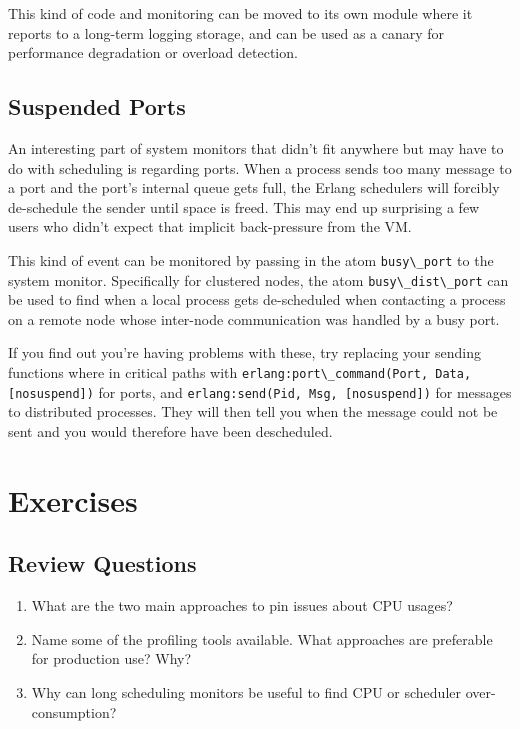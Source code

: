 \documentclass[11pt, oneside]{book}   	%
\newcommand{\function}[1]{\Verb`#1`}
\newcommand{\term}[1]{\Verb`#1`}
\begin{document}
This kind of code and monitoring can be moved to its own module where it reports to a long-term logging storage, and can be used as a canary for performance degradation or overload detection.

\subsection{Suspended Ports}
\label{subsec:port-system-monitors}

An interesting part of system monitors that didn't fit anywhere but may have to do with scheduling is regarding ports. When a process sends too many message to a port and the port's internal queue gets full, the Erlang schedulers will forcibly de-schedule the sender until space is freed. This may end up surprising a few users who didn't expect that implicit back-pressure from the VM.

This kind of event can be monitored by passing in the atom \term{busy\_port} to the system monitor. Specifically for clustered nodes, the atom \term{busy\_dist\_port} can be used to find when a local process gets de-scheduled when contacting a process on a remote node whose inter-node communication was handled by a busy port.

If you find out you're having problems with these, try replacing your sending functions where in critical paths with \function{erlang:port\_command(Port, Data, [nosuspend])} for ports, and \function{erlang:send(Pid, Msg, [nosuspend])} for messages to distributed processes. They will then tell you when the message could not be sent and you would therefore have been descheduled.


\section{Exercises}

\subsection{Review Questions}

\begin{enumerate}
	\item What are the two main approaches to pin issues about CPU usages?
	\item Name some of the profiling tools available. What approaches are preferable for production use? Why?
	\item Why can long scheduling monitors be useful to find CPU or scheduler over-consumption?

\end{enumerate}
\end{document}
